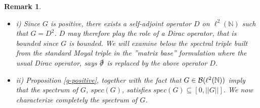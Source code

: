 \documentclass[a4paper,11pt,twoside]{article}
\numberwithin{equation}{section}
\newtheorem{remark}[Theorem]{Remark}
\theoremstyle{nonumberplain}
\begin{document}
\begin{remark}\label{locate-spectrum} \ \\[-20pt]
\begin{itemize}
\setlength{\itemsep}{-1pt}
\item i) Since $G$ is positive, there exists a self-adjoint operator $D$ on $\ell^2(\mathbb{N})$ such that $G=D^2$. $D$ may therefore play the role of a Dirac operator, that is bounded since $G$ is bounded. We will examine below the spectral triple built from the standard Moyal triple in the ''matrix base'' formulation where the usual Dirac operator, says $\slashed\partial$ is replaced by the above operator $D$.
\item ii) Proposition \ref{g-positive}, together with the fact that $G\in{\cal{B}}(\ell^2(\mathbb{N}))$ imply that the spectrum of $G$, $spec(G)$, satisfies $spec(G)\subseteq[0,||G||]$. We now characterize completely the spectrum of $G$.
\end{itemize}
\end{remark}
\end{document}
